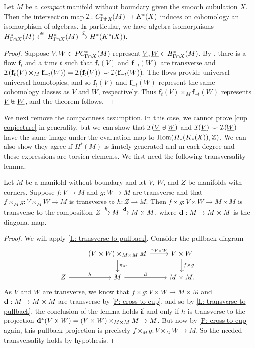 \documentclass{amsart}
\begin{document}
\begin{theorem}
Let $M$ be a \emph{compact} manifold without boundary given the smooth cubulation $X$. Then the intersection map  $\mathcal{I} \colon C^*_{\Gamma \pitchfork X}(M) \to K^*(X)$ induces on cohomology an isomorphism of algebras. In particular, we have algebra isomorphisms $H^*_{\Gamma\pitchfork X}(M) \xleftarrow{\cong} H^*_{\Gamma\pitchfork X}(M)\xrightarrow{\mathcal{I}} H^*(K^*(X)).$
\end{theorem}
\begin{proof}
Suppose $V,W\in PC^*_{\Gamma\pitchfork X}(M)$ represent $\underline{V},\underline{W}\in H^*_{\Gamma\pitchfork X}(M)$. By \cite[Theorem 1.1]{FMS-flows}, there is a flow $\mathbf{f}_t$ and a time $t$ such that $\mathbf{f}_t(V)$ and $\mathbf{f}_{-t}(W)$ are transverse and $\mathcal{I}(\mathbf{f}_t(V)\times_M \mathbf{f}_{-t}(W))=\mathcal{I}(\mathbf{f}_t(V)) \smile \mathcal{I}(\mathbf{f}_{-t}(W)).$
The flows provide universal universal homotopies, and so $\mathbf{f}_t(V)$ and $\mathbf{f}_{-t}(W)$ represent the same cohomology classes as $V$ and $W$, respectively. Thus $\mathbf{f}_t(V)\times_M \mathbf{f}_{-t}(W)$ represents $\underline{V} \uplus \underline{W}$, and the theorem follows. 
\end{proof}


We next remove the compactness assumption. In this case, we cannot prove \cref{cup conjecture} in generality, but we can show that  
$\mathcal{I}(\underline{V} \uplus \underline{W})$ and $\mathcal{I}(\underline{V}) \smile \mathcal{I}(\underline{W})$ have the same image under the evaluation map to $\textup{Hom}(H_*(K_*(X)),\mathbb{Z})$. We can also show they agree if $H^*(M)$ is finitely generated and in each degree and these expressions are torsion elements. We first need the following transversality lemma.


\begin{lemma}\label{L: trans diag cube}
Let $M$ be a manifold without boundary and let $V$, $W$, and $Z$ be  manifolds with corners. Suppose $f:V\to M$ and $g:W\to M$ are transverse and that $f\times_Mg:V\times_MW\to M$ is transverse to $h:Z\to M$. Then $f\times g:V\times W\to M\times M$ is transverse to the composition $Z\xrightarrow{h}M\xrightarrow{\mathbf{d}}M\times M$, where $\mathbf{d}:M\to M\times M$ is the diagonal map. 
\end{lemma}
\begin{proof}
We will apply \cref{L: transverse to pullback}. Consider the pullback diagram
	\[
	\begin{tikzcd}
		& (V \times W)\times_{M\times M} M \arrow[r, "\pi_{V\times W}"] \arrow[d, "\pi_M"] & V\times W \arrow[d, "f\times g"] \\
		Z \arrow[r, "h"] & M \arrow[r, "\diag"]&  M\times M.
	\end{tikzcd}
	\]
As $V$ and $W$ are transverse, we know that $f\times g:V\times W\to M\times M$ and $\mathbf{d}:M\to M\times M$ are transverse by \cref{P: cross to cup}, and so by \cref{L: transverse to pullback}, the conclusion of the lemma holds if and only if $h$ is transverse to the projection $\mathbf{d}^*(V\times W)=(V \times W)\times_{M\times M} M \to M$. But now by \cref{P: cross to cup} again, this pullback projection is precisely $f\times_Mg:V\times_MW\to M$. So the needed transversality holds by hypothesis. 
\end{proof}
\end{document}
